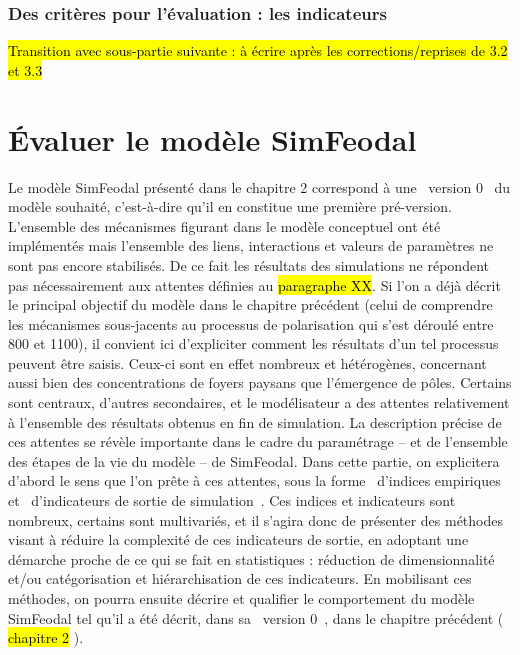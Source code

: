 \subsubsection{Des critères pour l'évaluation : les indicateurs}

\hl{Transition avec sous-partie suivante : à écrire après les corrections/reprises de 3.2 et 3.3}


\clearpage
\section{Évaluer le modèle SimFeodal}

Le modèle SimFeodal présenté dans le chapitre 2 correspond à une \og version 0 \fg{} du modèle souhaité, c'est-à-dire qu'il en constitue une première pré-version.
	L'ensemble des mécanismes figurant dans le modèle conceptuel ont été implémentés mais l'ensemble des liens, interactions et valeurs de paramètres ne sont pas encore stabilisés.
	De ce fait les résultats des simulations ne répondent pas nécessairement aux attentes définies au \hl{paragraphe XX}.
	Si l'on a déjà décrit le principal objectif du modèle dans le chapitre précédent (celui de comprendre les mécanismes sous-jacents au processus de polarisation qui s'est déroulé entre 800 et 1100), il convient ici d'expliciter comment les résultats d'un tel processus peuvent être saisis.
Ceux-ci sont en effet nombreux et hétérogènes, concernant aussi bien des concentrations de foyers paysans que l'émergence de pôles.
Certains sont centraux, d'autres secondaires, et le modélisateur a des attentes relativement à l'ensemble des résultats obtenus en fin de simulation.
La description précise de ces attentes se révèle importante dans le cadre du paramétrage -- et de l'ensemble des étapes de la vie du modèle -- de SimFeodal.
Dans cette partie, on explicitera d'abord le sens que l'on prête à ces attentes, sous la forme \og d'indices empiriques \fg{} et \og d'indicateurs de sortie de simulation \fg{}.
Ces indices et indicateurs sont nombreux, certains sont multivariés, et il s'agira donc de présenter des méthodes visant à réduire la complexité de ces indicateurs de sortie, en adoptant une démarche proche de ce qui se fait en statistiques : réduction de dimensionnalité et/ou catégorisation et hiérarchisation de ces indicateurs.
En mobilisant ces méthodes, on pourra ensuite décrire et qualifier le comportement du modèle SimFeodal tel qu'il a été décrit, dans sa \og version 0 \fg{}, dans le chapitre précédent (
\hl{chapitre 2}
).

